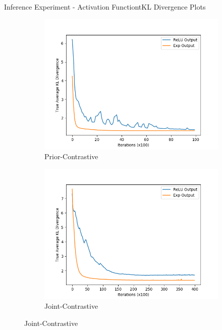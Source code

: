 \documentclass{beamer}
\begin{document}
\begin{frame}{Inference Experiment - Activation Functiont}{KL Divergence Plots}
\begin{figure}
\begin{subfigure}{0.49\textwidth}
\includegraphics[width=\linewidth]{truklmins/PCKLvsPCKLEXP.png}
\caption{Prior-Contrastive}
\end{subfigure}
\begin{subfigure}{0.49\textwidth}
\includegraphics[width=\linewidth]{truklmins/JCKLvsJCKLEXP.png}
\caption{Joint-Contrastive}
\end{subfigure}
\end{figure}
\end{frame}
\end{document}
